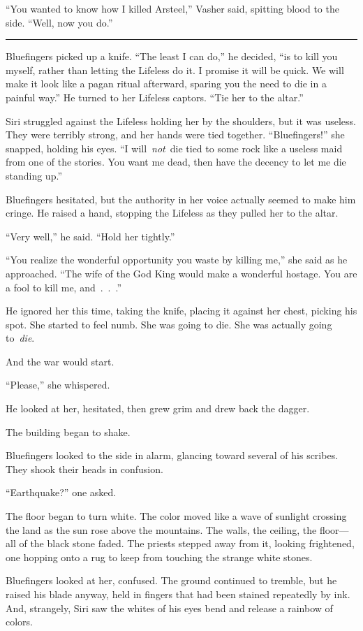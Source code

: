 “You wanted to know how I killed Arsteel,” Vasher said, spitting blood to the side. “Well, now you do.”

\bigskip \hrule \bigskip

Bluefingers picked up a knife. “The least I can do,” he decided, “is to kill you myself, rather than letting the Lifeless do it. I promise it will be quick. We will make it look like a pagan ritual afterward, sparing you the need to die in a painful way.” He turned to her Lifeless captors. “Tie her to the altar.”

Siri struggled against the Lifeless holding her by the shoulders, but it was useless. They were terribly strong, and her hands were tied together. “Bluefingers!” she snapped, holding his eyes. “I will~\textit{not}~die tied to some rock like a useless maid from one of the stories. You want me dead, then have the decency to let me die standing up.”

Bluefingers hesitated, but the authority in her voice actually seemed to make him cringe. He raised a hand, stopping the Lifeless as they pulled her to the altar.

“Very well,” he said. “Hold her tightly.”

“You realize the wonderful opportunity you waste by killing me,” she said as he approached. “The wife of the God King would make a wonderful hostage. You are a fool to kill me, and~.~.~.”

He ignored her this time, taking the knife, placing it against her chest, picking his spot. She started to feel numb. She was going to die. She was actually going to~\textit{die}.

And the war would start.

“Please,” she whispered.

He looked at her, hesitated, then grew grim and drew back the dagger.

The building began to shake.

Bluefingers looked to the side in alarm, glancing toward several of his scribes. They shook their heads in confusion.

“Earthquake?” one asked.

The floor began to turn white. The color moved like a wave of sunlight crossing the land as the sun rose above the mountains. The walls, the ceiling, the floor—all of the black stone faded. The priests stepped away from it, looking frightened, one hopping onto a rug to keep from touching the strange white stones.

Bluefingers looked at her, confused. The ground continued to tremble, but he raised his blade anyway, held in fingers that had been stained repeatedly by ink. And, strangely, Siri saw the whites of his eyes bend and release a rainbow of colors.

